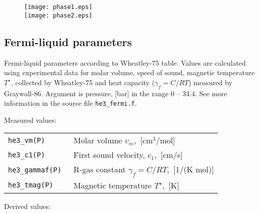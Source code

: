 \documentclass[a4paper]{article}
\begin{document}
\begin{figure}[p]
\texttt{[image: phase1.eps]}\\
\texttt{[image: phase2.eps]}
\end{figure}

\eject
\subsection*{Fermi-liquid parameters}

Fermi-liquid parameters according to {Wheatley-75} table. Values are
calculated using experimental data for molar volume, speed of sound,
magnetic temperature $T^\star$, collected by {Wheatley-75} and heat
capacity ($\gamma_f=C/RT$) measured by {Graywall-86}. Argument is
pressure, [bar] in the range 0 -- 34.4. See more information in the
source file {\tt he3\_fermi.f}.

\medskip
Measured values:

\medskip
\noindent\begin{tabular}{lp{12.5cm}}
\tt he3\_vm(P)     & Molar volume $v_m$,~[cm$^3$/mol]\\
\tt he3\_c1(P)     & First sound velocity, $c_1$,~[cm/s]\\
\tt he3\_gammaf(P) & R-gas constant $\gamma_f = C/RT$,~[1/(K mol)]\\
\tt he3\_tmag(P)   & Magnetic temperature $T^\star$,~[K]\newline\\
\end{tabular}

Derived values:
\end{document}
